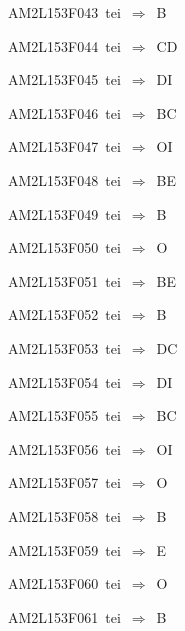 {\sixrm AM2L153F043\ {\sixit tei}\ }$\Rightarrow$\ B\par\smallskip
{\sixrm AM2L153F044\ {\sixit tei}\ }$\Rightarrow$\ CD\par\smallskip
{\sixrm AM2L153F045\ {\sixit tei}\ }$\Rightarrow$\ DI\par\smallskip
{\sixrm AM2L153F046\ {\sixit tei}\ }$\Rightarrow$\ BC\par\smallskip
{\sixrm AM2L153F047\ {\sixit tei}\ }$\Rightarrow$\ OI\par\smallskip
{\sixrm AM2L153F048\ {\sixit tei}\ }$\Rightarrow$\ BE\par\smallskip
{\sixrm AM2L153F049\ {\sixit tei}\ }$\Rightarrow$\ B\par\smallskip
{\sixrm AM2L153F050\ {\sixit tei}\ }$\Rightarrow$\ O\par\smallskip
{\sixrm AM2L153F051\ {\sixit tei}\ }$\Rightarrow$\ BE\par\smallskip
{\sixrm AM2L153F052\ {\sixit tei}\ }$\Rightarrow$\ B\par\smallskip
{\sixrm AM2L153F053\ {\sixit tei}\ }$\Rightarrow$\ DC\par\smallskip
{\sixrm AM2L153F054\ {\sixit tei}\ }$\Rightarrow$\ DI\par\smallskip
{\sixrm AM2L153F055\ {\sixit tei}\ }$\Rightarrow$\ BC\par\smallskip
{\sixrm AM2L153F056\ {\sixit tei}\ }$\Rightarrow$\ OI\par\smallskip
{\sixrm AM2L153F057\ {\sixit tei}\ }$\Rightarrow$\ O\par\smallskip
{\sixrm AM2L153F058\ {\sixit tei}\ }$\Rightarrow$\ B\par\smallskip
{\sixrm AM2L153F059\ {\sixit tei}\ }$\Rightarrow$\ E\par\smallskip
{\sixrm AM2L153F060\ {\sixit tei}\ }$\Rightarrow$\ O\par\smallskip
{\sixrm AM2L153F061\ {\sixit tei}\ }$\Rightarrow$\ B\par\smallskip


